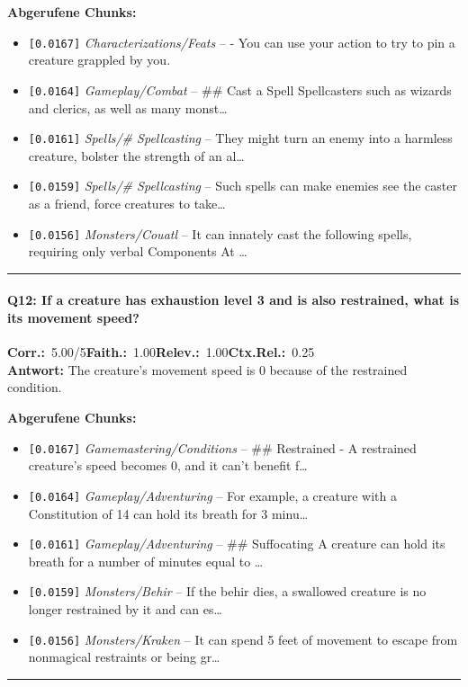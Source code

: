 \noindent\textbf{Abgerufene Chunks:}
\begin{itemize}[noitemsep, topsep=2pt]
  \item[\textbf{\#1}] \texttt{[0.0167]} \textit{Characterizations/Feats} -- - You can use your action to try to pin a creature grappled by you.
  \item[\textbf{\#2}] \texttt{[0.0164]} \textit{Gameplay/Combat} -- \#\# Cast a Spell  Spellcasters such as wizards and clerics, as well as many monst\ldots
  \item[\textbf{\#3}] \texttt{[0.0161]} \textit{Spells/# Spellcasting} -- They might turn an enemy into a harmless creature, bolster the strength of an al\ldots
  \item[\textbf{\#4}] \texttt{[0.0159]} \textit{Spells/# Spellcasting} -- Such spells can make enemies see the caster as a friend, force creatures to take\ldots
  \item[\textbf{\#5}] \texttt{[0.0156]} \textit{Monsters/Couatl} -- It can innately cast the following spells, requiring only verbal Components  At \ldots
\end{itemize}
\vspace{4pt}
\hrule
\vspace{6pt}

\paragraph{Q12: If a creature has exhaustion level 3 and is also restrained, what is its movement speed?}
\noindent \textbf{Corr.:}~5.00/5\quad \textbf{Faith.:}~1.00\quad \textbf{Relev.:}~1.00\quad \textbf{Ctx.Rel.:}~0.25\\

\noindent\textbf{Antwort:} The creature's movement speed is 0 because of the restrained condition.

\noindent\textbf{Abgerufene Chunks:}
\begin{itemize}[noitemsep, topsep=2pt]
  \item[\textbf{\#1}] \texttt{[0.0167]} \textit{Gamemastering/Conditions} -- \#\# Restrained  - A restrained creature's speed becomes 0, and it can't benefit f\ldots
  \item[\textbf{\#2}] \texttt{[0.0164]} \textit{Gameplay/Adventuring} -- For example, a creature with a Constitution of 14 can hold its breath for 3 minu\ldots
  \item[\textbf{\#3}] \texttt{[0.0161]} \textit{Gameplay/Adventuring} -- \#\# Suffocating  A creature can hold its breath for a number of minutes equal to \ldots
  \item[\textbf{\#4}] \texttt{[0.0159]} \textit{Monsters/Behir} -- If the behir dies, a swallowed creature is no longer restrained by it and can es\ldots
  \item[\textbf{\#5}] \texttt{[0.0156]} \textit{Monsters/Kraken} -- It can spend 5 feet of movement to escape from nonmagical restraints or being gr\ldots
\end{itemize}
\vspace{4pt}
\hrule
\vspace{6pt}

